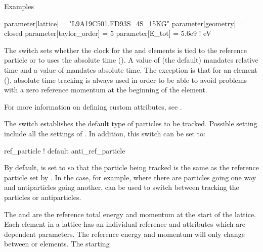 \noindent
Examples
\begin{example}
  parameter[lattice]      = "L9A19C501.FD93S_4S_15KG"
  parameter[geometry]     = closed
  parameter[taylor_order] = 5
  parameter[E_tot]        = 5.6e9    ! eV
\end{example}

  \begin{description}
  \item[{parameter[absolute_time_tracking]}] \Newline
The  switch sets whether the clock for the  and
 elements is tied to the reference particle or to uses the absolute time
(). A value of  (the default) mandates relative time and a value
of  mandates absolute time. The exception is that for an  element
(), absolute time tracking is always used in order to be able to avoid
problems with a zero reference momentum at the beginning of the element.
  \item[{parameter[custom_attributeN]}] \Newline
For more information on defining custom attributes, see .
  \item[{parameter[default_tracking_species]}] \Newline
The  switch establishes the
default type of particles to be tracked. Possible setting include
all the settings of . In addition, 
this switch can be set to:
\begin{example}
  ref_particle     ! default
  anti_ref_particle
\end{example}
By default,  is set to 
so that the particle being tracked is the same as the reference
particle set by . In the case, for example,
where there are particles going one way and antiparticles going another,
 can be used to switch between
tracking the particles or antiparticles.
  \item[{parameter[e_tot], parameter[p0c]}] \Newline
The  and  are the reference
total energy and momentum at the start of the lattice. Each element
in a lattice has an individual reference  and  attributes
which are dependent parameters. The reference energy and momentum will only
change between  or  elements. The starting

\end{description}
